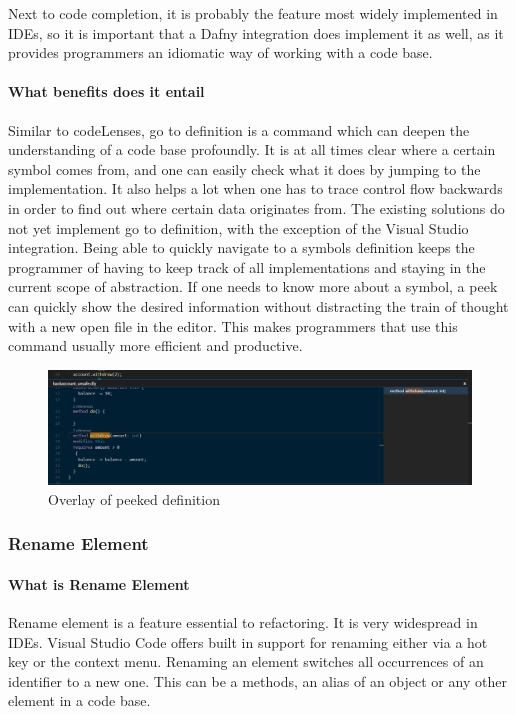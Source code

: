 Next to code completion, it is probably the feature most widely implemented in IDEs, so it is important that a Dafny integration does implement it as well, as it provides programmers an idiomatic way of working with a code base.

\paragraph{What benefits does it entail}
Similar to codeLenses, go to definition is a command which can deepen the understanding of a code base profoundly. It is at all times clear where a certain symbol comes from, and one can easily check what it does by jumping to the implementation. It also helps a lot when one has to trace control flow backwards in order to find out where certain data originates from. \newline
The existing solutions do not yet implement go to definition, with the exception of the Visual Studio integration. Being able to quickly navigate to a symbols definition keeps the programmer of having to keep track of all implementations and staying in the current scope of abstraction. If one needs to know more about a symbol, a peek can quickly show the desired information without distracting the train of thought with a new open file in the editor. This makes programmers that use this command usually more efficient and productive.\newline

\begin{figure}[H]
	\centering
	\includegraphics[width=1\textwidth]{img/goToDefinitionPeek}
	\caption{Overlay of peeked definition}
	\label{fig:aggotodefinitionpeek}
\end{figure}


\subsubsection{Rename Element} \label{agrenameelement}
\paragraph{What is Rename Element}
Rename element is a feature essential to refactoring. It is very widespread in IDEs. Visual Studio Code offers built in support for renaming either via a hot key or the context menu. Renaming an element switches all occurrences of an identifier to a new one. This can be a methods, an alias of an object or any other element in a code base. \newline

